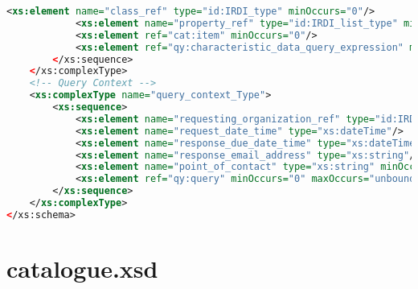 \begin{lstlisting}[caption=query.xsd, language=XML, label=lst:query_xsd]
            <xs:element name="class_ref" type="id:IRDI_type" minOccurs="0"/>
            <xs:element name="property_ref" type="id:IRDI_list_type" minOccurs="0"/>
            <xs:element ref="cat:item" minOccurs="0"/>
            <xs:element ref="qy:characteristic_data_query_expression" minOccurs="0" maxOccurs="unbounded"/>
        </xs:sequence>
    </xs:complexType>
    <!-- Query Context -->
    <xs:complexType name="query_context_Type">
        <xs:sequence>
            <xs:element name="requesting_organization_ref" type="id:IRDI_type"/>
            <xs:element name="request_date_time" type="xs:dateTime"/>
            <xs:element name="response_due_date_time" type="xs:dateTime" minOccurs="0"/>
            <xs:element name="response_email_address" type="xs:string"/>
            <xs:element name="point_of_contact" type="xs:string" minOccurs="0"/>
            <xs:element ref="qy:query" minOccurs="0" maxOccurs="unbounded"/>
        </xs:sequence>
    </xs:complexType>
</xs:schema>

 \end{lstlisting}  

\section{catalogue.xsd}

